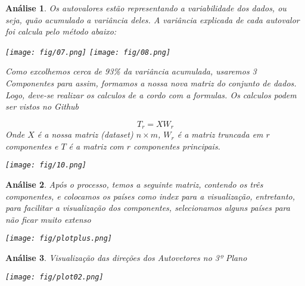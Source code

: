\documentclass[11pt,a4paper]{article}
\newtheorem{2}{Análise}
\begin{document}
\begin{2} \normalfont
Os autovalores estão representando a variabilidade dos dados, ou seja, quão acumulado a variância deles. A variância explicada de cada autovalor foi calcula pelo método abaixo:

\begin{center}
    \texttt{[image: fig/07.png]}
    \texttt{[image: fig/08.png]}
\end{center}

Como excolhemos cerca de 93\% da variância acumulada, usaremos 3 Componentes para assim, formamos a nossa nova matriz do conjunto de dados. Logo, deve-se realizar os calculos de a cordo com a formulas. Os calculos podem ser vistos no Github

$$T_r = XW_r$$
Onde $X$ é a nossa matriz (dataset) $n \times m$, $W_r$ é a matriz truncada em $r$ componentes e $T$ é a matriz com $r$ componentes principais.

\begin{center}
    \texttt{[image: fig/10.png]}
\end{center}
\end{2}

\begin{2} \normalfont Após o processo, temos a seguinte matriz, contendo os três componentes, e colocamos os países como index para a visualização, entretanto, para facilitar a visualização dos componentes, selecionamos alguns países para não ficar muito extenso

\begin{center}
    \texttt{[image: fig/plotplus.png]}
\end{center}
\end{2}

\begin{2} \normalfont Visualização das direções dos Autovetores no 3º Plano

\begin{center}
    \texttt{[image: fig/plot02.png]}
\end{center}
\end{2}
\end{document}
